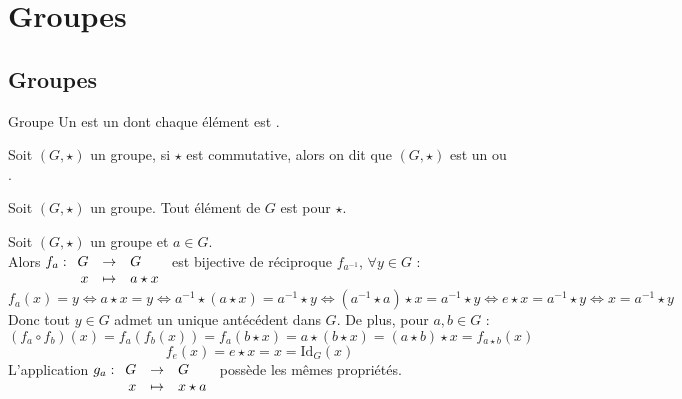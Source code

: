 \documentclass[12pt,a4paper]{report}
\begin{document}
    
\section{Groupes}

    \subsection{Groupes}

    \begin{definition}{Groupe}{}
    Un  est un  dont chaque élément est .
    \end{definition}
    
    \begin{remarque}
    Soit $(G, \star)$ un groupe, si $\star$ est commutative, alors on dit que $(G, \star)$ est un  ou .
    \end{remarque}
    
    \begin{remarque} Soit $(G, \star)$ un groupe. Tout élément de $G$ est  pour $\star$.
    \end{remarque}
    
    \begin{remarque} Soit $(G, \star)$ un groupe et $a \in G$.\\
    Alors $f_a : \begin{array}[t]{rcl} G & \rightarrow & G \\ x & \mapsto & a \star x \end{array}$ est bijective de réciproque $f_{a^{-1}}$, $\forall y \in G$ :
    $$ f_a(x) = y \Leftrightarrow a \star x = y \Leftrightarrow a^{-1} \star (a \star x) = a^{-1} \star y \Leftrightarrow \left(a^{-1} \star a\right) \star x = a^{-1} \star y \Leftrightarrow e \star x = a^{-1} \star y \Leftrightarrow x = a^{-1} \star y $$
    Donc tout $y \in G$ admet un unique antécédent dans $G$. De plus, pour $a, b \in G$ :
    $$ \left(f_a \circ f_b\right) (x) = f_a \left( f_b (x) \right) = f_a (b \star x) = a \star (b \star x) = (a \star b) \star x = f_{a \star b} (x) $$
    $$ f_e (x) = e \star x = x = \text{Id}_G (x) $$
    L'application $g_a : \begin{array}[t]{rcl} G & \rightarrow & G \\ x & \mapsto & x \star a \end{array}$ possède les mêmes propriétés.
    \end{remarque}
    
\end{document}
